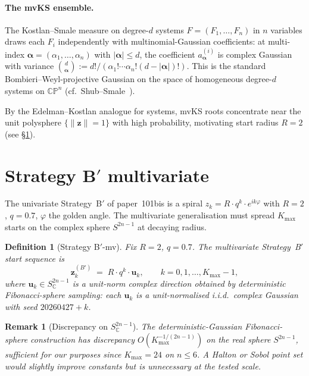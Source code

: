 \documentclass[11pt,a4paper]{article}
\newtheorem{definition}[theorem]{Definition}
\newtheorem{remark}[theorem]{Remark}
\begin{document}
\paragraph{The mvKS ensemble.}
The Kostlan--Smale measure on degree-$d$ systems $F = (F_1, \dots, F_n)$ in $n$ variables draws each $F_i$ independently with multinomial-Gaussian coefficients: at multi-index $\boldsymbol\alpha = (\alpha_1, \dots, \alpha_n)$ with $|\boldsymbol\alpha| \le d$, the coefficient $a^{(i)}_{\boldsymbol\alpha}$ is complex Gaussian with variance $\binom{d}{\boldsymbol\alpha} := d!/(\alpha_1! \cdots \alpha_n! (d - |\boldsymbol\alpha|)!)$. This is the standard Bombieri--Weyl-projective Gaussian on the space of homogeneous degree-$d$ systems on $\mathbb{C}\mathbb{P}^n$ (cf.\ Shub--Smale~\cite{shubsmale}).

By the Edelman--Kostlan analogue for systems, mvKS roots concentrate near the unit polysphere $\{\|\mathbf z\| = 1\}$ with high probability, motivating start radius $R = 2$ (see \S\ref{sec:Bprime-mv}).

\section{Strategy B$'$ multivariate}\label{sec:Bprime-mv}

The univariate Strategy~B$'$ of paper~101bis is a spiral $z_k = R \cdot q^k \cdot e^{i k \varphi}$ with $R = 2$, $q = 0.7$, $\varphi$ the golden angle. The multivariate generalisation must spread $K_{\max}$ starts on the complex sphere $S^{2n-1}$ at decaying radius.

\begin{definition}[Strategy B$'$-mv]\label{def:Bprime-mv}
Fix $R = 2$, $q = 0.7$. The multivariate Strategy~B$'$ start sequence is
\begin{equation}\label{eq:Bprime-mv}
\mathbf{z}_k^{(B')} \;=\; R \cdot q^k \cdot \mathbf{u}_k, \qquad k = 0, 1, \dots, K_{\max} - 1,
\end{equation}
where $\mathbf{u}_k \in S^{2n-1}_{\mathbb{C}}$ is a unit-norm complex direction obtained by deterministic Fibonacci-sphere sampling: each $\mathbf{u}_k$ is a unit-normalised i.i.d.\ complex Gaussian with seed $20260427 + k$.
\end{definition}

\begin{remark}[Discrepancy on $S^{2n-1}_{\mathbb{C}}$]
The deterministic-Gaussian Fibonacci-sphere construction has discrepancy $O(K_{\max}^{-1/(2n-1)})$ on the real sphere $S^{2n-1}$, sufficient for our purposes since $K_{\max} = 24$ on $n \le 6$. A Halton or Sobol point set would slightly improve constants but is unnecessary at the tested scale.
\end{remark}
\end{document}
